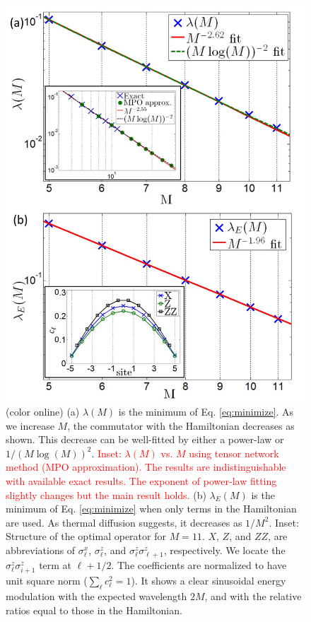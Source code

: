 \documentclass[twocolumn,superscriptaddress, prl,showpacs]{revtex4-1}
\newcommand{\addr}[1]{\textcolor{red}{#1}}
\begin{document}
\begin{figure}
\includegraphics[width=0.95\linewidth]{fig_hamiltonian_modified.pdf}
\centering
\caption{(color online) (a) $\lambda(M)$ is the minimum of Eq. \eqref{eq:minimize}.  As we increase $M$, the commutator with the Hamiltonian decreases as shown.
This decrease can be well-fitted by either a power-law or $1/(M\log(M))^2$. \addr{Inset: $\lambda(M)$ vs. $M$ using tensor network method (MPO approximation). The results are indistinguishable with available exact results. The exponent of power-law fitting slightly changes but the main result holds.} 
(b) $\lambda_E(M)$ is the minimum of Eq. \eqref{eq:minimize} when only terms in the Hamiltonian are used.  As thermal diffusion suggests, it decreases as $1/M^2$. Inset: Structure of the optimal operator for $M = 11$. $X$, $Z$, and $ZZ$, are
abbreviations of $\sigma^x_\ell$, $\sigma^z_\ell$, and $\sigma^z_\ell \sigma^z_{\ell+1}$, respectively.
We locate the $\sigma^z_\ell \sigma^z_{i+1}$ term at $\ell+1/2$.  The coefficients are normalized to have unit square norm ($\sum_\ell c_\ell^2 = 1$).
It shows a clear sinusoidal energy modulation with the expected wavelength $2M$, and with the relative ratios equal to those in the Hamiltonian.}
\label{fig:hamiltonian}
\end{figure}
\end{document}
